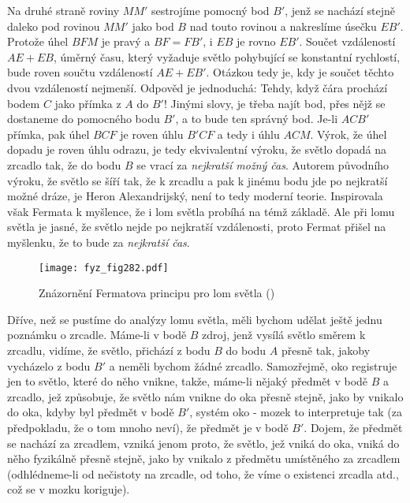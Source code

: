     Na druhé straně roviny \(MM'\) sestrojíme pomocný bod \(B'\), jenž se nachází stejně daleko pod 
    rovinou \(MM'\) jako bod \(B\) nad touto rovinou a nakreslíme úsečku \(EB'\). Protože úhel 
    \(BFM\) je pravý a \(BF = FB'\), i \(EB\) je rovno \(EB'\). Součet vzdáleností \(AE + EB\), 
    úměrný času, který vyžaduje světlo pohybující se konstantní rychlostí, bude roven součtu 
    vzdáleností \(AE + EB'\). Otázkou tedy je, kdy je součet těchto dvou vzdáleností nejmenší. 
    Odpověd je jednoduchá: Tehdy, když čára prochází bodem \(C\) jako přímka z \(A\) do \(B'\)! 
    Jinými slovy, je třeba najít bod, přes nějž se dostaneme do pomocného bodu \(B'\), a to bude 
    ten správný bod. Je-li \(ACB'\) přímka, pak úhel \(BCF\) je roven úhlu \(B'CF\) a tedy i úhlu 
    \(ACM\). Výrok, že úhel dopadu je roven úhlu odrazu, je tedy ekvivalentní výroku, že světlo 
    dopadá na zrcadlo tak, že do bodu \(B\) se vrací za \emph{nejkratší možný čas}. Autorem 
    původního výroku, že světlo se šíří tak, že k zrcadlu a pak k jinému bodu jde po nejkratší 
    možné dráze, je Heron Alexandrijský, není to tedy moderní teorie. Inspirovala však Fermata k 
    myšlence, že i lom světla probíhá na témž základě. Ale při lomu světla je jasné, že světlo 
    nejde po nejkratší vzdálenosti, proto Fermat přišel na myšlenku, že to bude za \emph{nejkratší 
    čas}.
    
    \begin{figure}[ht!] %
      \centering
      \texttt{[image: fyz\_fig282.pdf]}
      \caption{Znázornění Fermatova principu pro lom světla
               (\cite[s.~348]{Feynman01})}
      \label{fyz:fig282}
    \end{figure}

    Dříve, než se pustíme do analýzy lomu světla, měli bychom udělat ještě jednu poznámku o 
    zrcadle. Máme-li v bodě \(B\) zdroj, jenž vysílá světlo směrem k zrcadlu, vidíme, že světlo, 
    přichází z bodu \(B\) do bodu \(A\) přesně tak, jakoby vycházelo z bodu \(B'\) a neměli bychom 
    žádné zrcadlo. Samozřejmě, oko registruje jen to světlo, které do něho vnikne, takže, máme-li 
    nějaký předmět v bodě \(B\) a zrcadlo, jež způsobuje, že světlo nám vnikne do oka přesně 
    stejně, jako by vnikalo do oka, kdyby byl předmět v bodě \(B'\), systém oko - mozek to 
    interpretuje tak (za předpokladu, že o tom mnoho neví), že předmět je v bodě \(B'\). Dojem, že 
    předmět se nachází za zrcadlem, vzniká jenom proto, že světlo, jež vniká do oka, vniká do něho 
    fyzikálně přesně stejně, jako by vnikalo z předmětu umístěného za zrcadlem (odhlédneme-li od 
    nečistoty na zrcadle, od toho, že víme o existenci zrcadla atd., což se v mozku koriguje).
    
